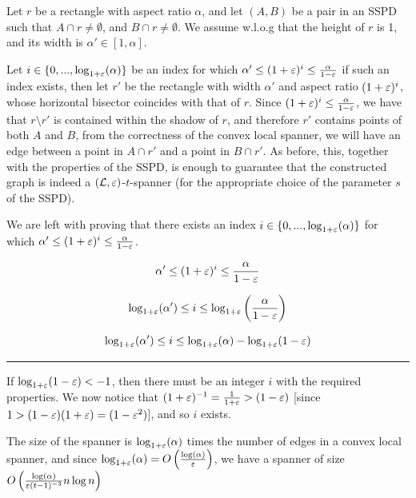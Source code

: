 \documentclass[12pt]{article}%
\begin{document}
Let $r$ be a rectangle with aspect ratio $\alpha$, and let $(A,B)$ be
a pair in an SSPD such that $A\cap r\neq \emptyset$, and
$B\cap r\neq \emptyset$. We assume w.l.o.g that the height of $r$ is
1, and its width is $\alpha'\in [1,\alpha]$.

Let $i\in \{0,...,\log_{1+\varepsilon}(\alpha)\}$ be an index for which
$\alpha' \leq (1+\varepsilon)^i \leq \frac{\alpha}{1-\varepsilon}$ if such an index
exists, then let $r'$ be the rectangle with width $\alpha'$ and aspect
ratio $(1+\varepsilon)^i$, whose horizontal bisector coincides with that of
$r$. Since $(1+\varepsilon)^i \leq \frac{\alpha}{1-\varepsilon}$, we have that
$r\setminus r'$ is contained within the shadow of $r$, and therefore
$r'$ contains points of both $A$ and $B$, from the correctness of the
convex local spanner, we will have an edge between a point in
$A\cap r'$ and a point in $B\cap r'$. As before, this, together with
the properties of the SSPD, is enough to guarantee that the
constructed graph is indeed a $(\mathcal{L}, \varepsilon)$-$t$-spanner (for the
appropriate choice of the parameter $s$ of the SSPD).

We are left with proving that there exists an index
$i\in \{0,...,\log_{1+\varepsilon}(\alpha)\}$ for which
$\alpha' \leq (1+\varepsilon)^i \leq \frac{\alpha}{1-\varepsilon}$.




\begin{equation}
    \alpha' \leq (1+\varepsilon)^i \leq \frac{\alpha}{1-\varepsilon}
\end{equation}

\begin{equation}
    \log_{1+\varepsilon}(\alpha') \leq i \leq
    \log_{1+\varepsilon}\left(\frac{\alpha}{1-\varepsilon}\right)
\end{equation}

\begin{equation}
    \log_{1+\varepsilon}(\alpha') \leq i \leq \log_{1+\varepsilon}(\alpha) -
    \log_{1+\varepsilon}(1-\varepsilon)
\end{equation}

\hrule

If $\log_{1+\varepsilon}(1-\varepsilon)<-1$, then there must be an integer $i$ with
the required properties. We now notice that
$(1+\varepsilon)^{-1}=\frac{1}{1+\varepsilon}>(1-\varepsilon)$ [since
$1>(1-\varepsilon)(1+\varepsilon)=(1-\varepsilon^2)$], and so $i$ exists.

The size of the spanner is $\log_{1+\varepsilon}(\alpha)$ times the number of
edges in a convex local spanner, and since
$\log_{1+\varepsilon}(\alpha)=O\left(\frac{\log(\alpha)}{\varepsilon}\right)$, we
have a spanner of size
$O\left(\frac{\log(\alpha)}{\varepsilon (t-1)^{-3}}n\log n\right)$
\end{document}
